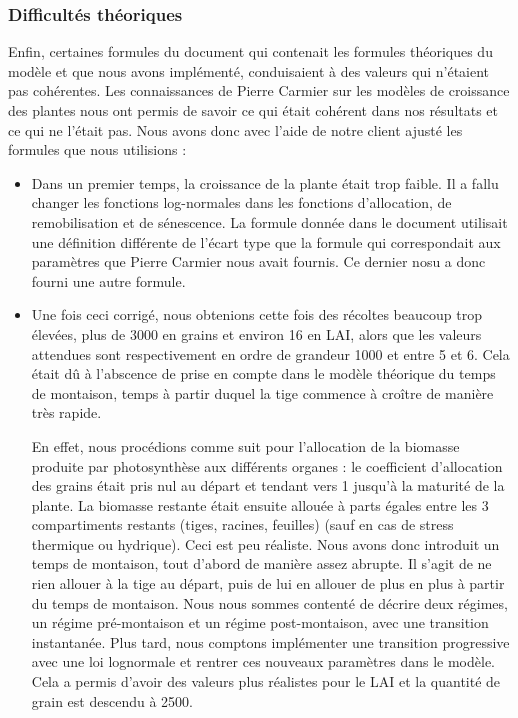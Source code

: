 \subsubsection{Difficultés théoriques}
Enfin, certaines formules du document qui contenait les formules théoriques du modèle et que nous avons implémenté, conduisaient à des valeurs qui n'étaient pas cohérentes. Les connaissances de Pierre Carmier sur les modèles de croissance des plantes nous ont permis de savoir ce qui était cohérent dans nos résultats et ce qui ne l'était pas. 
Nous avons donc avec l'aide de notre client ajusté les formules que nous utilisions :  
\begin{itemize}
	\item Dans un premier temps, la croissance de la plante était trop faible. Il a fallu changer les fonctions log-normales dans les fonctions d'allocation, de remobilisation et de sénescence. 
La formule donnée dans le document  utilisait une définition différente de l'écart type que la formule qui correspondait aux paramètres que Pierre Carmier nous avait fournis. Ce dernier nosu a donc fourni une autre formule.
	\item Une fois ceci corrigé, nous obtenions cette fois des récoltes beaucoup trop élevées, plus de 3000 en grains et environ 16 en LAI, alors que les valeurs attendues sont respectivement en ordre de grandeur 1000 et entre 5 et 6.
Cela était dû à l'abscence de prise en compte dans le modèle théorique du temps de montaison, temps à partir duquel la tige commence à croître de manière très rapide.

En effet, nous procédions comme suit pour l'allocation de la biomasse produite par photosynthèse aux différents organes : le coefficient d'allocation des grains était pris nul au départ et tendant vers 1 jusqu'à la maturité de la plante. La biomasse restante était ensuite allouée à parts égales entre les 3 compartiments restants (tiges, racines, feuilles) (sauf en cas de stress thermique ou hydrique). Ceci est peu réaliste.
Nous avons donc introduit un temps de montaison, tout d'abord de manière assez abrupte. 
Il s'agit de ne rien allouer à la tige au départ, puis de lui en allouer de plus en plus à partir du temps de montaison. Nous nous sommes contenté de décrire deux régimes, un régime pré-montaison et un régime post-montaison, avec une transition instantanée. Plus tard, nous comptons implémenter une transition progressive avec une loi lognormale et rentrer ces nouveaux paramètres dans le modèle.
Cela a permis d'avoir des valeurs plus réalistes pour le LAI et la quantité de grain est descendu à 2500.


\end{itemize}
